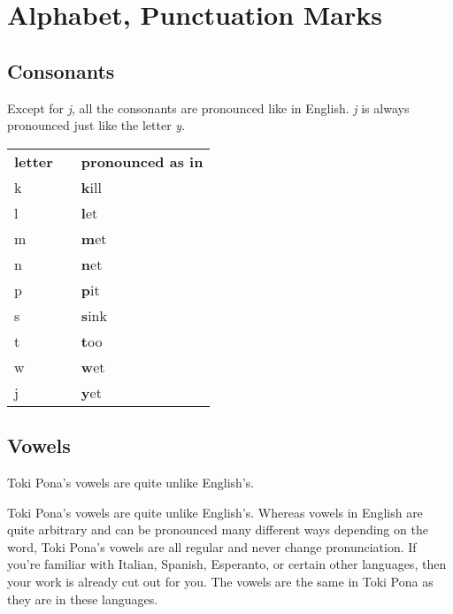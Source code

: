 \label{'pronunciation_alphabet'}
\section{Alphabet, Punctuation Marks}
%
\subsection*{Consonants}
%
Except for \textit{j}, all the consonants are pronounced like in English. 
\textit{j} is always pronounced just like the letter \textit{y}. 

\begin{supertabular}{p{2cm}|ll}
\textbf{letter}   &&    \textbf{pronounced as in} \\ %
k && \textbf{k}ill  \\ %
l && \textbf{l}et   \\ %
m && \textbf{m}et   \\ %
n && \textbf{n}et   \\ %
p && \textbf{p}it   \\ %
s && \textbf{s}ink  \\ %
t && \textbf{t}oo   \\ %
w && \textbf{w}et   \\ %
j && \textbf{y}et   \\ %
\end{supertabular} 

\subsection*{Vowels}
%
Toki Pona's vowels are quite unlike English's. 

Toki Pona's vowels are quite unlike English's. Whereas vowels in English are quite arbitrary and can be pronounced many different ways depending on the word, Toki Pona's vowels are all regular and never change pronunciation. 
If you're familiar with Italian, Spanish, Esperanto, or certain other languages, then your work is already cut out for you. 
The vowels are the same in Toki Pona as they are in these languages. 

